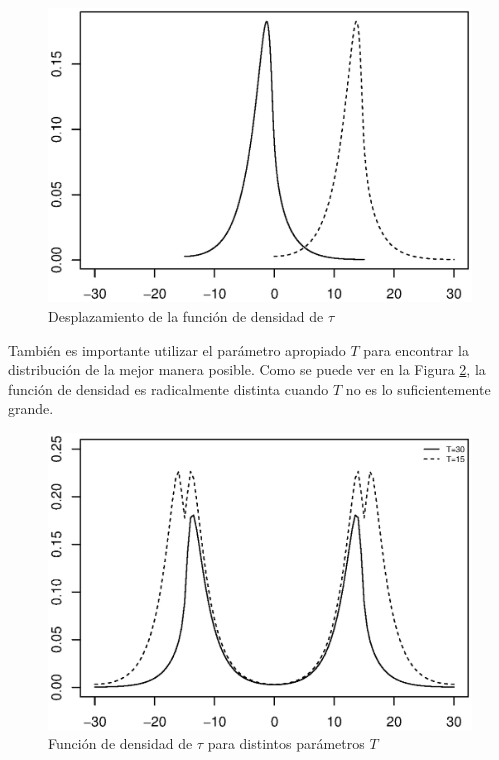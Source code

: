 \documentclass[11pt]{article}
\numberwithin{equation}{section} %
\begin{document}
\begin{figure}[htbp] \centering
\includegraphics[scale=0.75,trim=0 1cm 0 1cm]{probpmshift.eps}
\caption{Desplazamiento de la función de densidad de $\tau$}
\label{probmtshift}
\end{figure}

También es importante utilizar el parámetro apropiado $T$ para encontrar la distribución de la mejor manera posible. Como se puede ver en la Figura \ref{probmtpar}, la función de densidad es radicalmente distinta cuando $T$ no es lo suficientemente grande.

\begin{figure}[htbp] \centering
\includegraphics[scale=0.75,trim=0 1cm 0 1cm]{probpmpar.eps}
\caption{Función de densidad de $\tau$ para distintos parámetros $T$}
\label{probmtpar}
\end{figure}
\end{document}

